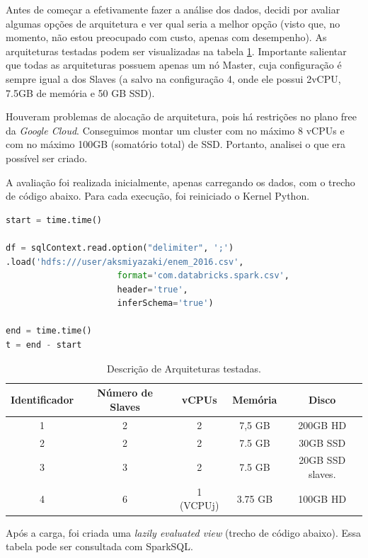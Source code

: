 \documentclass{article}
\begin{document}
Antes de começar a efetivamente fazer a análise dos dados, decidi por avaliar algumas opções de arquitetura e ver qual seria a melhor opção (visto que, no momento, não estou preocupado com custo, apenas com desempenho). As arquiteturas testadas podem ser visualizadas na tabela \ref{tab:arqs}. Importante salientar que todas as arquiteturas possuem apenas um nó Master, cuja configuração é sempre igual a dos Slaves (a salvo na configuração 4, onde ele possui 2vCPU, 7.5GB de memória e 50 GB SSD).

Houveram problemas de alocação de arquitetura, pois há restrições no plano free da \emph{Google Cloud}. Conseguimos montar um cluster com no máximo 8 vCPUs e com no máximo 100GB (somatório total) de SSD. Portanto, analisei o que era possível ser criado.

A avaliação foi realizada inicialmente, apenas carregando os dados, com o trecho de código abaixo. Para cada execução, foi reiniciado o Kernel Python.

\begin{lstlisting}[caption= {Carga de dados no Spark},captionpos=b, language=python]
start = time.time()

df = sqlContext.read.option("delimiter", ';')
.load('hdfs:///user/aksmiyazaki/enem_2016.csv', 
                      format='com.databricks.spark.csv', 
                      header='true', 
                      inferSchema='true')

end = time.time()
t = end - start
\end{lstlisting}


\begin{table}[H]
\centering
\begin{tabular}{|c|c|c|c|c|}
\hline
Identificador & Número de Slaves & vCPUs &  Memória & Disco \\ \hline \hline
1 & 2 & 2 & 7,5 GB & 200GB HD  \\ \hline
2 & 2 & 2 & 7.5 GB & 30GB SSD \\ \hline
3 & 3 & 2 & 7.5 GB & 20GB SSD  slaves. \\ \hline
4 & 6 & 1 (VCPUj) & 3.75 GB & 100GB HD   \\ \hline
\end{tabular}
\caption{Descrição de Arquiteturas testadas.}
\label{tab:arqs}
\end{table}

Após a carga, foi criada uma \emph{lazily evaluated view} (trecho de código abaixo). Essa tabela pode ser consultada com SparkSQL. 
\end{document}
